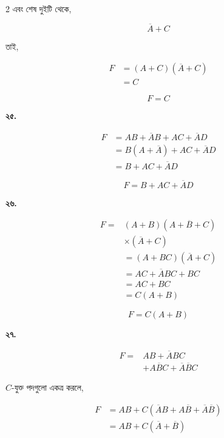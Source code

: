 \begin{multicols}{2}
এবং শেষ দুইটি থেকে,

\[
\overline A+C
\]

তাই,

\[
\begin{aligned}
F
&=(A+C)(\overline A+C)\\
&=C
\end{aligned}
\]

\[
\boxed{F=C}
\]

\medskip


\textbf{২৫.}

\[
\begin{aligned}
F
&=AB+\overline AB+AC+\overline AD\\
&=B(A+\overline A)+AC+\overline AD\\
&=B+AC+\overline AD
\end{aligned}
\]

\[
\boxed{F=B+AC+\overline AD}
\]

\medskip


\textbf{২৬.}

\[
\begin{aligned}
F
={}&(A+B)(A+\overline B+C)\\
&\times(\overline A+C)\\
&=(A+BC)(\overline A+C)\\
&=AC+\overline ABC+BC\\
&=AC+BC\\
&=C(A+B)
\end{aligned}
\]

\[
\boxed{F=C(A+B)}
\]

\medskip


\textbf{২৭.}

\[
\begin{aligned}
F
={}&AB+\overline ABC\\
&+A\overline BC+\overline A\overline BC
\end{aligned}
\]

\(C\)-যুক্ত পদগুলো একত্র করলে,

\[
\begin{aligned}
F
&=AB+C(\overline AB+A\overline B
+\overline A\overline B)\\
&=AB+C(\overline A+\overline B)
\end{aligned}
\]


\end{multicols}
